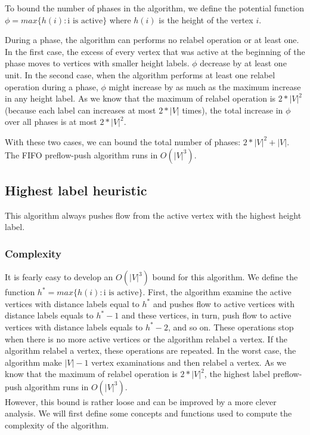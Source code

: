 To bound the number of phases in the algorithm, we define the potential function $\phi = max\{h(i) : \text{i is active}\}$ where $h(i)$ is the height of the vertex $i$.

During a phase, the algorithm can performs no relabel operation or at least one. In the first case, the excess of every vertex that was active at the beginning of the phase moves to vertices with smaller height labels. $\phi$ decrease by at least one unit. In the second case, when the algorithm performs at least one relabel operation during a phase, $\phi$ might increase by as much as the maximum increase in any height label. As we know that the maximum of relabel operation is $2*|V|^2$ (because each label can increases at most $2*|V|$ times), the total increase in $\phi$ over all phases is at most $2*|V|^2$.

With these two cases, we can bound the total number of phases: $2*|V|^2 + |V|$. The FIFO preflow-push algorithm runs in $O(|V|^3)$.

\subsection{Highest label heuristic}
\label{sec:hlh}

This algorithm always pushes flow from the active vertex with the highest height label. 

\subsubsection{Complexity}

It is fearly easy to develop an $O(|V|^3)$ bound for this algorithm. We define the function $h^{*} = max\{h(i): \text{i is active}\}$. First, the algorithm examine the active vertices with distance labels equal to $h^{*}$ and pushes flow to active vertices with distance labels equals to $h^{*}-1$ and these vertices, in turn, push flow to active vertices with distance labels equals to $h^{*}-2$, and so on. These operations stop when there is no more active vertices or the algorithm relabel a vertex. If the algorithm relabel a vertex, these operations are repeated. In the worst case, the algorithm make $|V| - 1$ vertex examinations and then relabel a vertex. As we know that the maximum of relabel operation is $2*|V|^2$, the highest label preflow-push algorithm runs in $O(|V|^3)$.\\

However, this bound is rather loose and can be improved by a more clever analysis. We will first define some concepts and functions used to compute the complexity of the algorithm.\\

